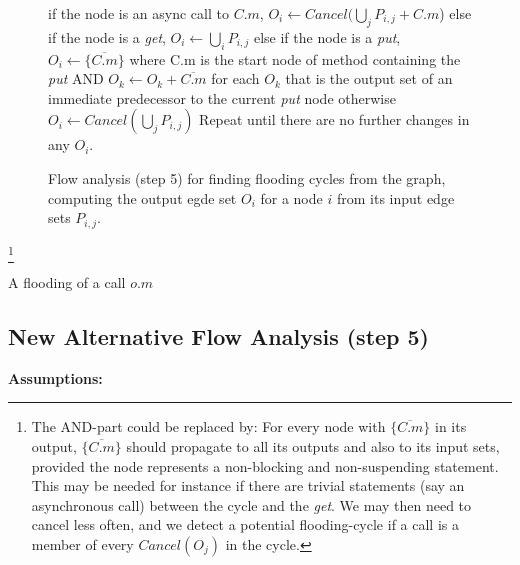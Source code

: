 \documentclass[12pt]{article}%
\begin{document}
\begin{figure}
\begin{shaded}
if the node is an async call to $C.m$, $O_i \leftarrow Cancel(\bigcup_j P_{i,j} + C.m$)\newline
else if the node is a \emph{get}, $O_i \leftarrow \bigcup_i P_{i,j}$\newline
else if the node is a \emph{put}, \newline
\hspace*{.5cm}  $O_i \leftarrow \{ \overline{C.m} \}$ where C.m is the start node of method containing the \emph{put}\newline
AND $O_k \leftarrow O_k + \overline{C.m}$ for each $O_k$ that is the output set of an immediate predecessor to the current \emph{put} node\newline
otherwise $O_i \leftarrow Cancel(\bigcup_j P_{i,j})$\newline
Repeat until there are no further changes in any $O_i$.%
\end{shaded}%
\caption{\label{step5}%
Flow analysis (step 5) for finding flooding cycles from the graph,
computing the output egde set $O_i$ for a node $i$ from its input edge sets 
$P_{i,j}$.
}
\end{figure}
\footnote{The AND-part could be replaced by:
For every node with $\{ \overline{C.m} \}$ in its output,
$\{ \overline{C.m} \}$ should propagate to all its outputs and also to its input sets, 
provided the node represents a  non-blocking and non-suspending statement.
This may be needed for instance if there are 
trivial statements (say an asynchronous call)
between the cycle and the \emph{get}.
We may then need to cancel less often,
and we detect a potential flooding-cycle if a call
is a member of every  $Cancel(O_j)$ in the cycle.
}

A flooding of a call $o.m$ 
\subsection{New Alternative Flow Analysis (step 5)}

\textbf{Assumptions:}
\end{document}
